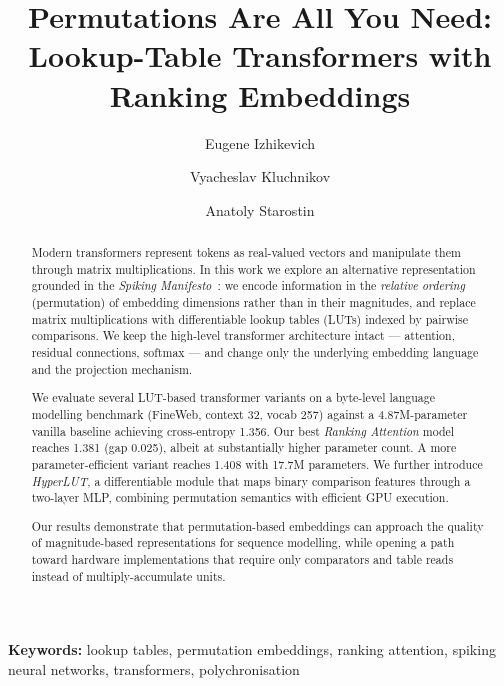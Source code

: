 \documentclass[11pt]{article}
\begin{document}
\title{\Large\textbf{Permutations Are All You Need:\\Lookup-Table Transformers with Ranking Embeddings}}

\author{Eugene Izhikevich \and Vyacheslav Kluchnikov \and Anatoly Starostin}
\date{}

\maketitle

\begin{abstract}
Modern transformers represent tokens as real-valued vectors and manipulate them through matrix multiplications.
In this work we explore an alternative representation grounded in the \emph{Spiking Manifesto}~\cite{ref:manifesto}: we encode information in the \emph{relative ordering} (permutation) of embedding dimensions rather than in their magnitudes, and replace matrix multiplications with differentiable lookup tables (LUTs) indexed by pairwise comparisons.
We keep the high-level transformer architecture intact --- attention, residual connections, softmax --- and change only the underlying embedding language and the projection mechanism.

We evaluate several LUT-based transformer variants on a byte-level language modelling benchmark (FineWeb, context 32, vocab 257) against a 4.87M-parameter vanilla baseline achieving cross-entropy 1.356.
Our best \emph{Ranking Attention} model reaches 1.381 (gap 0.025), albeit at substantially higher parameter count.
A more parameter-efficient variant reaches 1.408 with 17.7M parameters.
We further introduce \emph{HyperLUT}, a differentiable module that maps binary comparison features through a two-layer MLP, combining permutation semantics with efficient GPU execution.

Our results demonstrate that permutation-based embeddings can approach the quality of magnitude-based representations for sequence modelling, while opening a path toward hardware implementations that require only comparators and table reads instead of multiply-accumulate units.
\end{abstract}

\medskip
\noindent\textbf{Keywords:} lookup tables, permutation embeddings, ranking attention, spiking neural networks, transformers, polychronisation


\end{document}
